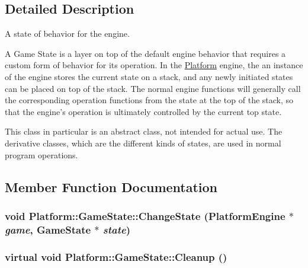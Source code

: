 \subsection{Detailed Description}
A state of behavior for the engine. 

A Game State is a layer on top of the default engine behavior that requires a custom form of behavior for its operation. In the \hyperlink{namespace_platform}{Platform} engine, the an instance of the engine stores the current state on a stack, and any newly initiated states can be placed on top of the stack. The normal engine functions will generally call the corresponding operation functions from the state at the top of the stack, so that the engine's operation is ultimately controlled by the current top state.

This class in particular is an abstract class, not intended for actual use. The derivative classes, which are the different kinds of states, are used in normal program operations. 

\subsection{Member Function Documentation}
\hypertarget{class_platform_1_1_game_state_602091629b4bca2073f12bfa6c61e6d0}{
\subsubsection[{ChangeState}]{\setlength{\rightskip}{0pt plus 5cm}void Platform::GameState::ChangeState ({\bf PlatformEngine} $\ast$ {\em game}, \/  {\bf GameState} $\ast$ {\em state})}}
\label{d4/d4f/class_platform_1_1_game_state_602091629b4bca2073f12bfa6c61e6d0}


\hypertarget{class_platform_1_1_game_state_e85d9b80e26a0a4708423e370d0a4b8a}{
\subsubsection[{Cleanup}]{\setlength{\rightskip}{0pt plus 5cm}virtual void Platform::GameState::Cleanup ()}}
\label{d4/d4f/class_platform_1_1_game_state_e85d9b80e26a0a4708423e370d0a4b8a}




